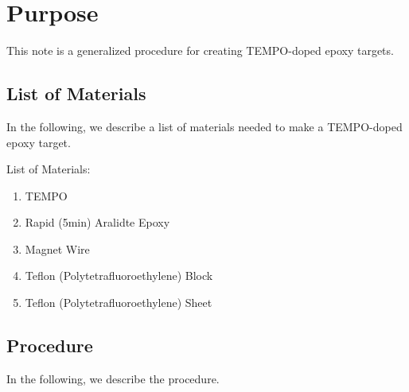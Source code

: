 \documentclass[12pt,epsfig]{article}
\begin{document}
\section{Purpose}
This note is a generalized procedure for creating TEMPO-doped epoxy targets.

\subsection{List of Materials}
In the following, we describe a list of materials needed to make a TEMPO-doped epoxy target. 

List of Materials: 
\begin{enumerate}
\item  TEMPO
\item  Rapid (5min) Aralidte Epoxy 
\item  Magnet Wire
\item  Teflon (Polytetrafluoroethylene) Block 
\item  Teflon (Polytetrafluoroethylene) Sheet 
\end{enumerate}


\subsection{Procedure}
In the following, we  describe the  procedure. 
\end{document}
